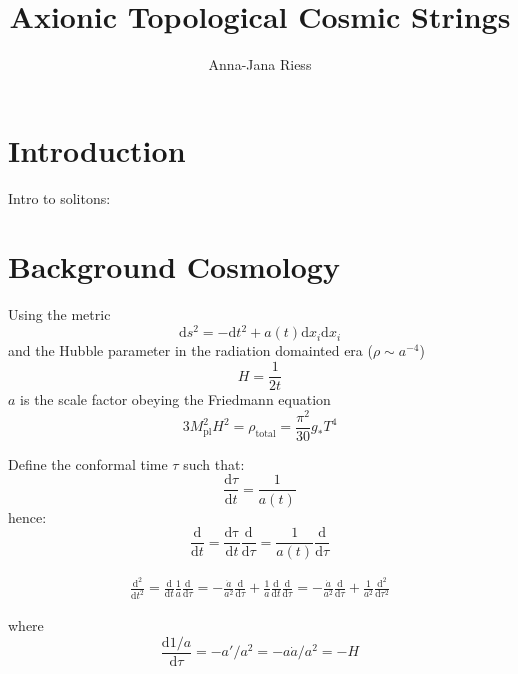\documentclass[a4paper]{article}
\begin{document}
	
\title{Axionic Topological Cosmic Strings}
\author{Anna-Jana Riess}

\maketitle

\section{Introduction}
Intro to solitons: \cite{tasi_solitons}

\section{Background Cosmology}
Using the metric
\begin{equation}
    \mathrm{d}s^2 = -\mathrm{d}t^2 + a(t) \mathrm{d} x_i \mathrm{d} x_i
\end{equation}
and the Hubble parameter in the radiation domainted era ($\rho \sim a^{-4}$)
\begin{equation}
    H = \frac{1}{2t}
\end{equation}
$a$ is the scale factor obeying the Friedmann equation
\begin{equation}
	\label{eq:friedmann_radiation}
    3 M_\mathrm{pl}^2 H^2 = \rho_\mathrm{total} = \frac{\pi^2}{30} g_* T^4
\end{equation}

Define the conformal time $\tau$ such that:
\begin{equation}
    \frac{\mathrm{d} \tau}{\mathrm{d} t} = \frac{1}{a(t)}
\end{equation}
hence:
\begin{equation}
    \frac{\mathrm{d}}{\mathrm{d} t} = \frac{\mathrm{d \tau}}{\mathrm{d} t} \frac{\mathrm{d}}{\mathrm{d} \tau} = \frac{1}{a(t)} \frac{\mathrm{d}}{\mathrm{d} \tau}
\end{equation}

\begin{align}
    \frac{\mathrm{d}^2}{\mathrm{d} t^2} = \frac{\mathrm{d}}{\mathrm{d} t} \frac{1}{a} \frac{\mathrm{d}}{\mathrm{d} \tau}
    = - \frac{\dot{a}}{a^2} \frac{\mathrm{d}}{\mathrm{d} \tau} + \frac{1}{a} \frac{\mathrm{d}}{\mathrm{d} t} \frac{\mathrm{d}}{\mathrm{d} \tau}
     = - \frac{\dot{a}}{a^2} \frac{\mathrm{d}}{\mathrm{d} \tau} + \frac{1}{a^2} \frac{\mathrm{d}^2}{\mathrm{d} \tau^2}
\end{align}

where
\begin{equation}
    \frac{\mathrm{d} 1/a}{\mathrm{d} \tau} = - a' / a^2 = - a \dot{a} / a^2 = - H
\end{equation}
\end{document}
